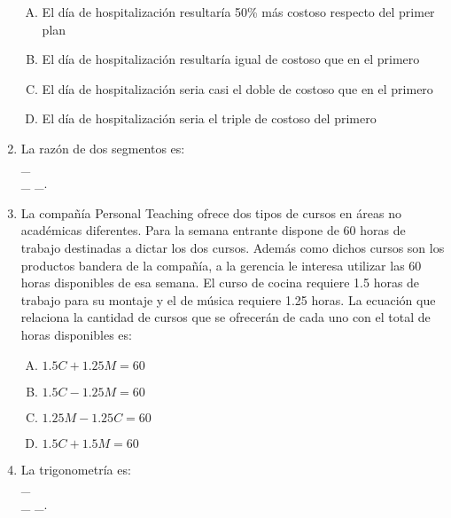 \begin{enumerate}
\begin{enumerate}[(A)]
\item  El día de hospitalización resultaría 50\% más costoso respecto del primer plan
\item El día de hospitalización resultaría igual de costoso que en el primero
\item El día de hospitalización seria casi el doble de costoso que en el primero
\item El día de hospitalización seria el triple de costoso del primero
\end{enumerate}


\item La razón de dos segmentos es: \label{yolma-23}\hrulefill\\
\_\hrulefill\\
\_\hrulefill
\_\hrulefill.


\newpage
\item La compañía Personal Teaching ofrece dos tipos de cursos en áreas no académicas diferentes. Para la semana entrante dispone de 60 horas de trabajo destinadas a dictar los dos cursos. Además como dichos cursos son los productos bandera de la compañía, a la gerencia le interesa utilizar las 60 horas disponibles de esa semana. El curso de cocina requiere 1.5 horas de trabajo para su montaje y el de música requiere 1.25 horas. La ecuación que relaciona la cantidad de cursos que se ofrecerán de cada uno con el total de horas disponibles es: \label{yolma-24}
\begin{enumerate}[(A)]
\item  $1.5C+1.25M=60$
\item $1.5C-1.25M=60$
\item $1.25M-1.25C=60$
\item $1.5C+1.5M=60$
\end{enumerate}


\item La trigonometría es: \label{yolma-25}\hrulefill\\
\_\hrulefill\\
\_\hrulefill
\_\hrulefill.

\end{enumerate}

